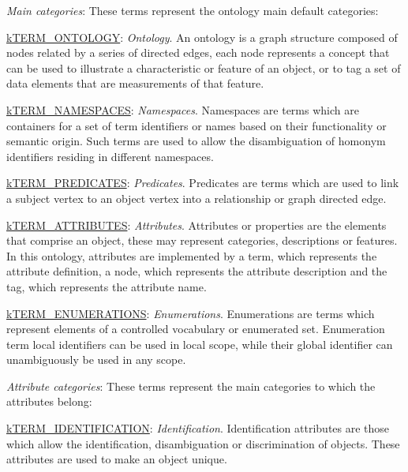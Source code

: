 \begin{DoxyItemize}
\item {\itshape Main categories}\-: These terms represent the ontology main default categories\-: 
\begin{DoxyItemize}
\item {\ttfamily \hyperlink{}{k\-T\-E\-R\-M\-\_\-\-O\-N\-T\-O\-L\-O\-G\-Y}}\-: {\itshape Ontology}. An ontology is a graph structure composed of nodes related by a series of directed edges, each node represents a concept that can be used to illustrate a characteristic or feature of an object, or to tag a set of data elements that are measurements of that feature. 
\item {\ttfamily \hyperlink{}{k\-T\-E\-R\-M\-\_\-\-N\-A\-M\-E\-S\-P\-A\-C\-E\-S}}\-: {\itshape Namespaces}. Namespaces are terms which are containers for a set of term identifiers or names based on their functionality or semantic origin. Such terms are used to allow the disambiguation of homonym identifiers residing in different namespaces. 
\item {\ttfamily \hyperlink{}{k\-T\-E\-R\-M\-\_\-\-P\-R\-E\-D\-I\-C\-A\-T\-E\-S}}\-: {\itshape Predicates}. Predicates are terms which are used to link a subject vertex to an object vertex into a relationship or graph directed edge. 
\item {\ttfamily \hyperlink{}{k\-T\-E\-R\-M\-\_\-\-A\-T\-T\-R\-I\-B\-U\-T\-E\-S}}\-: {\itshape Attributes}. Attributes or properties are the elements that comprise an object, these may represent categories, descriptions or features. In this ontology, attributes are implemented by a term, which represents the attribute definition, a node, which represents the attribute description and the tag, which represents the attribute name. 
\item {\ttfamily \hyperlink{}{k\-T\-E\-R\-M\-\_\-\-E\-N\-U\-M\-E\-R\-A\-T\-I\-O\-N\-S}}\-: {\itshape Enumerations}. Enumerations are terms which represent elements of a controlled vocabulary or enumerated set. Enumeration term local identifiers can be used in local scope, while their global identifier can unambiguously be used in any scope. 
\end{DoxyItemize}
\item {\itshape Attribute categories}\-: These terms represent the main categories to which the attributes belong\-: 
\begin{DoxyItemize}
\item {\ttfamily \hyperlink{}{k\-T\-E\-R\-M\-\_\-\-I\-D\-E\-N\-T\-I\-F\-I\-C\-A\-T\-I\-O\-N}}\-: {\itshape Identification}. Identification attributes are those which allow the identification, disambiguation or discrimination of objects. These attributes are used to make an object unique. 

\end{DoxyItemize}
\end{DoxyItemize}
